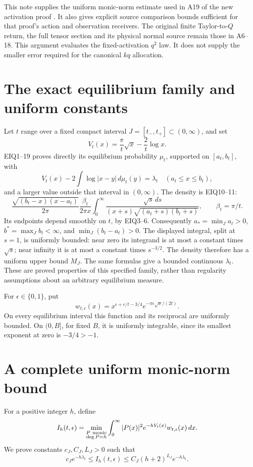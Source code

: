 \documentclass[11pt]{article}
\begin{document}
This note supplies the uniform monic-norm estimate used in A19 of the
new activation proof \cite{APActivation}. It also gives explicit source
comparison bounds sufficient for that proof's action and observation
receivers. The original finite Taylor-to-\(Q\) return, the full tensor
section and its physical normal source remain those in A6--18.
This argument evaluates the fixed-activation \(q^2\) law. It does not
supply the smaller error required for the canonical \(kq\) allocation.

\section{The exact equilibrium family and uniform constants}
Let \(t\) range over a fixed compact interval
\(J=[t_-,t_+]\subset(0,\infty)\), and set
\[
V_t(x)=\frac{\pi}{t}\sqrt x-\frac2t\log x.
\]
EIQ1--19 \cite{APEIQ} proves directly its equilibrium probability
\(\mu_t\), supported on \([a_t,b_t]\), with
\[
V_t(x)-2\int\log|x-y|\,d\mu_t(y)=\lambda_t
\quad(a_t\le x\le b_t),
\]
and a larger value outside that interval in \((0,\infty)\).
The density is EIQ10--11:
\[
\frac{\sqrt{(b_t-x)(x-a_t)}}{2\pi}
\frac{\beta_t}{2\pi x}
\int_0^\infty
\frac{\sqrt s\,ds}{(x+s)\sqrt{(a_t+s)(b_t+s)}},
\qquad \beta_t=\pi/t.
\]
Its endpoints depend smoothly on \(t\), by EIQ3--6.
Consequently \(a_*=\min_Ja_t>0\),
\(b^*=\max_Jb_t<\infty\), and \(\min_J(b_t-a_t)>0\).
The displayed integral, split at \(s=1\), is uniformly bounded:
near zero its integrand is at most a constant times \(\sqrt s\);
near infinity it is at most a constant times \(s^{-3/2}\).
The density therefore has a uniform upper bound \(M_J\).
The same formulas give a bounded continuous \(\lambda_t\).
These are proved properties of this specified family, rather than
regularity assumptions about an arbitrary equilibrium measure.

For \(\epsilon\in\{0,1\}\), put
\[
w_{t,\epsilon}(x)
=x^{\epsilon+\epsilon/t-3/4}
 e^{-\pi\epsilon\sqrt x/(2t)} .
\]
On every equilibrium interval this function and its reciprocal
are uniformly bounded. On \((0,B]\), for fixed \(B\), it is
uniformly integrable, since its smallest exponent at zero is
\(-3/4>-1\).

\section{A complete uniform monic-norm bound}
For a positive integer \(h\), define
\[
I_h(t,\epsilon)=
\min_{\substack{P\ {\rm monic}\\\deg P=h}}
\int_0^\infty |P(x)|^2e^{-hV_t(x)}w_{t,\epsilon}(x)\,dx.
\]
We prove constants \(c_J,C_J,L_J>0\) such that
\begin{equation}\tag{AP1}
c_Je^{-h\lambda_t}\le I_h(t,\epsilon)
\le C_J(h+2)^{L_J}e^{-h\lambda_t}.
\end{equation}
\end{document}
